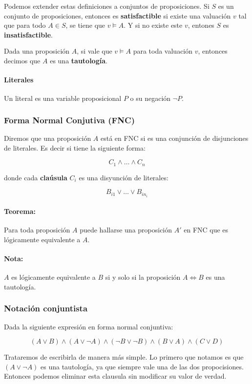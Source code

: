 Podemos extender estas definiciones a conjuntos de proposiciones. Si $S$ es un conjunto de proposiciones, entonces es \textbf{satisfactible} si existe una valuación $v$ tal que para todo $A\in S$, se tiene que $v\models A$. Y si no existe este $v$, entones $S$ es \textbf{insatisfactible}.

Dada una proposición $A$, si vale que $v\models A$ para toda valuación $v$, entonces decimos que $A$ es una \textbf{tautología}.

\paragraph{Literales} Un literal es una variable proposicional $P$ o su negación $\lnot P$.

\subsubsection{Forma Normal Conjutiva (FNC)}\label{Logica::Proposicional::FNC}
Diremos que una proposición $A$ está en FNC si es una conjunción de disjunciones de literales. Es decir si tiene la siguiente forma:

$$C_1 \land\dots\land C_n$$

donde cada \textbf{claúsula} $C_i$ es una disyunción de literales:

$$B_{i1}\lor\dots\lor B_{in_i}$$

\paragraph{Teorema:} Para toda proposición $A$ puede hallarse una proposición $A'$ en FNC que es lógicamente equivalente a $A$.

\paragraph{Nota:} $A$ es lógicamente equivalente a $B$ si y solo si la proposición $A\iff B$ es una tautología. 

\subsubsection*{Notación conjuntista}
Dada la siguiente expresión en forma normal conjuntiva:

$$(A\lor B)\land(A\lor \lnot A) \land (\lnot B \lor \lnot B) \land (B\lor A)\land (C\lor D)$$
 
Trataremos de escribirla de manera más simple. Lo primero que notamos es que $(A \lor \lnot A)$ es una tautología, ya que siempre vale una de las dos propocisiones. Entonces podemos eliminar esta clausula sin modificar su valor de verdad.

